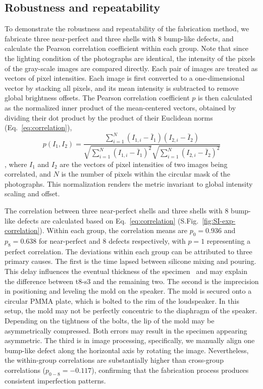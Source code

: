 \documentclass[letter,11pt]{article}
\begin{document}
\subsection{Robustness and repeatability}
To demonstrate the robustness and repeatability of the fabrication method, we fabricate three near-perfect and three shells with 8 bump-like defects, and calculate the Pearson correlation coefficient within each group. Note that since the lighting condition of the photographs are identical, the intensity of the pixels of the gray-scale images are compared directly. Each pair of images are treated as vectors of pixel intensities. Each image is first converted to a one-dimensional vector by stacking all pixels, and its mean intensity is subtracted to remove global brightness offsets. The Pearson correlation coefficient $p$ is then calculated as the normalized inner product of the mean-centered vectors, obtained by dividing their dot product by the product of their Euclidean norms (Eq.~\ref{eq:correlation}),
\begin{equation}
p(I_1,I_2) = \frac{\sum_{i=1}^N ( I_{1,i} - \bar{I}_1) (I_{2,i} - \bar{I}_2)}{\sqrt{\sum_{i=1}^N ( I_{1,i} - \bar{I}_1)^2}\sqrt{\sum_{i=1}^N ( I_{2,i} - \bar{I}_2)^2}}
\label{eq:correlation}
\end{equation}
, where $I_1$ and $I_2$ are the vectors of pixel intensities of two images being correlated, and $N$ is the number of pixels within the circular mask of the photographs. This normalization renders the metric invariant to global intensity scaling and offset.

The correlation between three near-perfect shells and three shells with 8 bump-like defects are calculated based on Eq.~\ref{eq:correlation} (S.Fig.~\ref{fig:SI-exp-correlation}). Within each group, the correlation means are $p_0=0.936$ and $p_8=0.638$ for near-perfect and 8 defects respectively, with $p=1$ representing a perfect correlation. The deviations within each group can be attributed to three primary causes. The first is the time lapsed between silicone mixing and pouring. This delay influences the eventual thickness of the specimen~\cite{lee2016fabrication} and may explain the difference between t8-s3 and the remaining two. The second is the imprecision in positioning and leveling the mold on the speaker. The mold is secured onto a circular PMMA plate, which is bolted to the rim of the loudspeaker. In this setup, the mold may not be perfectly concentric to the diaphragm of the speaker. Depending on the tightness of the bolts, the lip of the mold may be asymmetrically compressed. Both errors may result in the specimen appearing asymmetric. The third is in image processing, specifically, we manually align one bump-like defect along the horizontal axis by rotating the image. Nevertheless, the within-group correlations are substantially higher than cross-group correlations ($p_{0-8}=-0.117$), confirming that the fabrication process produces consistent imperfection patterns.
\end{document}
